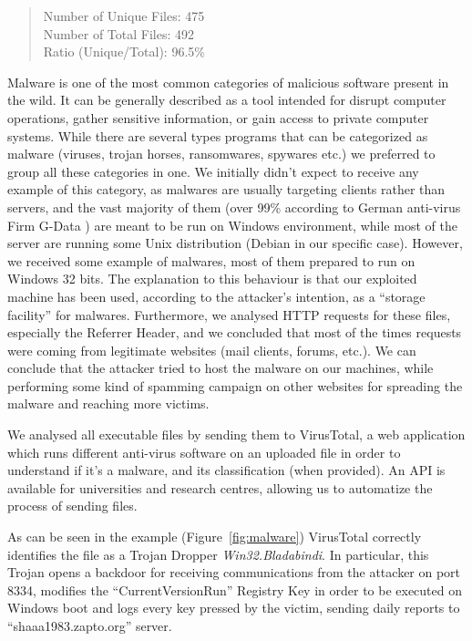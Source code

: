 \begin{quote}
Number of Unique Files: 475\\
Number of Total Files: 492\\
Ratio (Unique/Total): 96.5\%
\end{quote}

Malware is one of the most common categories of malicious software present in the wild. It can be generally described as a tool intended for disrupt computer operations, gather sensitive information, or gain access to private computer systems. While there are several types programs that can be categorized as malware (viruses, trojan horses, ransomwares, spywares etc.) we preferred to group all these categories in one. We initially didn't expect to receive any example of this category, as malwares are usually targeting clients rather than servers, and the vast majority of them (over 99\% according to German anti-virus Firm G-Data \cite{malwWin}) are meant to be run on Windows environment, while most of the server are running some Unix distribution (Debian in our specific case). However, we received some example of malwares, most of them prepared to run on Windows 32 bits. The explanation to this behaviour is that our exploited machine has been used, according to the attacker's intention, as a ``storage facility'' for malwares. Furthermore, we analysed HTTP requests for these files, especially the Referrer Header, and we concluded that most of the times requests were coming from legitimate websites (mail clients, forums, etc.). We can conclude that the attacker tried to host the malware on our machines, while performing some kind of spamming campaign on other websites for spreading the malware and reaching more victims.

We analysed all executable files by sending them to VirusTotal, a web application which runs different anti-virus software on an uploaded file in order to understand if it's a malware, and its classification (when provided). An API is available for universities and research centres, allowing us to automatize the process of sending files.

As can be seen in the example (Figure~\ref{fig:malware}) VirusTotal correctly identifies the file as a Trojan Dropper \emph{Win32.Bladabindi}. In particular, this Trojan opens a backdoor for receiving communications from the attacker on port 8334, modifies the ``CurrentVersionRun'' Registry Key in order to be executed on Windows boot and logs every key pressed by the victim, sending daily reports to ``shaaa1983.zapto.org'' server.


